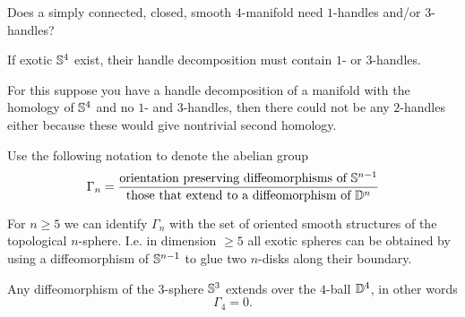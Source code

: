 \begin{openquestion*}[]
	Does a simply connected, closed, smooth $4$-manifold need
	$1$-handles and/or $3$-handles?
\end{openquestion*}

\begin{observation}
	If exotic $\mathbb{S}^{4}$ exist, their handle decomposition must
	contain $1$- or $3$-handles.
	
	For this suppose you have a handle decomposition of a manifold
	with the homology of $\mathbb{S}^{4}$ and no $1$- and $3$-handles,
	then there could not be any $2$-handles either because these would
	give nontrivial second homology. 
\end{observation}

\begin{definition}
	Use the following notation to denote the abelian group
	\begin{equation*}
		\Gamma_n = 
		\frac{\textrm{orientation preserving diffeomorphisms of } \mathbb{S}^{n-1}}
			 {\textrm{those that extend to a diffeomorphism of } \mathbb{D}^{n}}
	\end{equation*}
\end{definition}

\begin{proposition}
	For $n \ge 5$ we can identify $\Gamma_{n}$
	with the set of oriented smooth structures
	of the topological $n$-sphere.
	I.e. in dimension $\ge 5$ all exotic spheres
	can be obtained by using a diffeomorphism of
	$\mathbb{S}^{n-1}$ to glue two $n$-disks along their boundary.
\end{proposition}

\begin{theorem}
	Any diffeomorphism of the $3$-sphere $\mathbb{S}^{3}$
	extends over the $4$-ball $\mathbb{D}^{4}$,
	in other words
	\[
		\Gamma_4 = 0.
	\]
\end{theorem}

